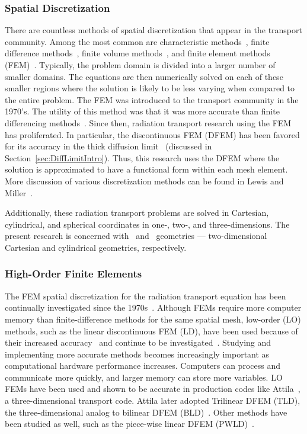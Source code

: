 \documentclass[12pt,letterpaper]{article}
\begin{document}
\subsubsection{Spatial Discretization}
\label{subsec:SpatialDiscretization}
There are countless methods of spatial discretization that appear in the transport community. Among the most common are characteristic methods~\cite{AdamsCharacteristicMethods}, finite difference methods~\cite{Lewis_Comp_Methods_Neu_Trans}, finite volume methods~\cite{Palmer2016Neutronics4}, and finite element methods (FEM)~\cite{Lewis_Comp_Methods_Neu_Trans}. Typically, the problem domain is divided into a larger number of smaller domains. The equations are then numerically solved on each of these smaller regions where the solution is likely to be less varying when compared to the entire problem. The FEM was introduced to the transport community in the 1970's. The utility of this method was that it was more accurate than finite differencing methods~\cite{ReedTriangularMesh}. Since then, radiation transport research using the FEM has proliferated. In particular, the discontinuous FEM (DFEM) has been favored for its accuracy in the thick diffusion limit~\cite{LarsenAsymptotic} (discussed in Section~\ref{sec:DiffLimitIntro}). Thus, this research uses the DFEM where the solution is approximated to have a functional form within each mesh element. More discussion of various discretization methods can be found in Lewis and Miller~\cite{Lewis_Comp_Methods_Neu_Trans}.

Additionally, these radiation transport problems are solved in Cartesian, cylindrical, and spherical coordinates in one-, two-, and three-dimensions. The present research is concerned with \XY\ and \RZ\ geometries ---  two-dimensional Cartesian and cylindrical geometries, respectively.

\subsubsection{High-Order Finite Elements}
\label{sec:HODFEMIntro}
The FEM spatial discretization for the radiation transport equation has been continually investigated since the 1970s~\cite{ReedTriangularMesh, LasaintFEM}. Although FEMs require more computer memory than finite-difference methods for the same spatial mesh, low-order (LO) methods, such as the linear discontinuous FEM (LD), have been used because of their increased accuracy~\cite{LarsenAsymptotic} and continue to be investigated~\cite{LarsenConvergenceRates,HamiltonNegativeFluxFixups,Adams_Disc_FEM_Thick_Diff}. Studying and implementing more accurate methods becomes increasingly important as computational hardware performance increases. Computers can process and communicate more quickly, and larger memory can store more variables. LO FEMs have been used and shown to be accurate in production codes like Attila~\cite{WareingAttila}, a three-dimensional transport code. Attila later adopted Trilinear DFEM (TLD), the three-dimensional analog to bilinear DFEM (BLD)~\cite{AttilaUsersManual}. Other methods have been studied as well, such as the piece-wise linear DFEM (PWLD)~\cite{BaileyDFEMCylindrical}.
\end{document}
